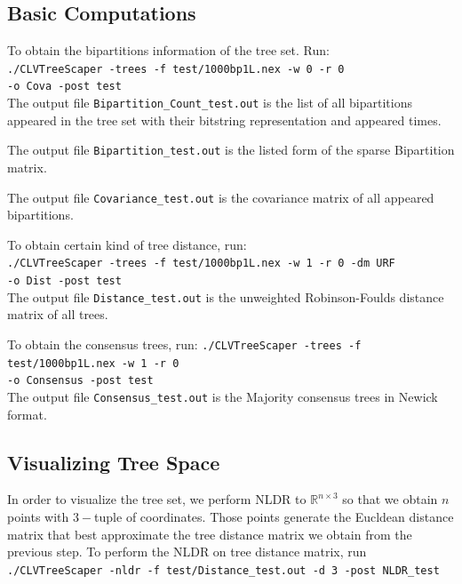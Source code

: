 \documentclass[11pt]{article}
\begin{document}
\subsection{Basic Computations}\label{subsubsect:BasicComp}

To obtain the bipartitions information of the tree set. Run:\\
{\tt ./CLVTreeScaper -trees -f {test/1000bp1L.nex} -w 0 -r 0}\\
{\tt -o Cova -post test }\\

The output file {\tt Bipartition\_Count\_test.out} is the list of all bipartitions appeared in the tree set with their bitstring representation and appeared times.

The output file {\tt Bipartition\_test.out} is the listed form of the sparse Bipartition matrix.

The output file {\tt Covariance\_test.out} is the covariance matrix of all appeared bipartitions.

To obtain certain kind of tree distance, run:\\
{\tt ./CLVTreeScaper -trees -f {test/1000bp1L.nex} -w 1 -r 0 -dm URF}\\
{\tt -o Dist -post test }\\

The output file {\tt Distance\_test.out} is the unweighted Robinson-Foulds distance matrix of all trees.

To obtain the consensus trees, run:
{\tt ./CLVTreeScaper -trees -f {test/1000bp1L.nex} -w 1 -r 0 }\\
{\tt -o Consensus -post test }\\

The output file {\tt Consensus\_test.out} is the Majority consensus trees in Newick format. 



\subsection{Visualizing Tree Space}\label{subsect:VisualizeTreeSpace}

In order to visualize the tree set, we perform NLDR to $\mathbb{R}^{n\times 3}$ so that we obtain $n$ points with $3-$tuple of coordinates. Those points generate the Eucldean distance matrix that best approximate the tree distance matrix we obtain from the previous step. To perform the NLDR on tree distance matrix, run
{\tt ./CLVTreeScaper -nldr -f {test/Distance\_test.out} -d 3 -post NLDR\_test}\\
\end{document}
